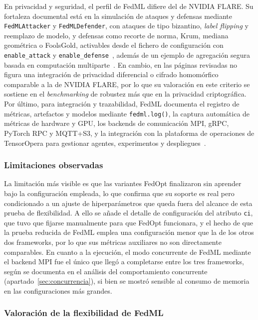 En privacidad y seguridad, el perfil de FedML difiere del de NVIDIA FLARE. Su
fortaleza documental está en la simulación de ataques y defensas mediante
\texttt{FedMLAttacker} y \texttt{FedMLDefender}, con ataques de tipo bizantino,
\textit{label flipping} y reemplazo de modelo, y defensas como recorte de norma, Krum,
mediana geométrica o FoolsGold, activables desde el fichero de configuración con
\texttt{enable\_\allowbreak attack} y \texttt{enable\_\allowbreak defense}~\parencite{fedmlSecurity}, además de un
ejemplo de agregación segura basada en computación multiparte~\parencite{fedmlExamples}.
En cambio, en las páginas revisadas no figura una integración de privacidad diferencial o
cifrado homomórfico comparable a la de NVIDIA FLARE, por lo que su valoración en este
criterio se sostiene en el \textit{benchmarking} de robustez más que en la privacidad
criptográfica. Por último, para integración y trazabilidad, FedML documenta el registro
de métricas, artefactos y modelos mediante \texttt{fedml.log()}, la captura automática de
métricas de hardware y GPU, los backends de comunicación MPI, gRPC, PyTorch RPC y MQTT+S3,
y la integración con la plataforma de operaciones de TensorOpera para gestionar agentes,
experimentos y despliegues~\parencite{fedmlTracking,fedmlExamples}.

\subsubsection{Limitaciones observadas}\label{subsec:flex-fedml-lim}

La limitación más visible es que las variantes FedOpt finalizaron sin aprender bajo
la configuración empleada, lo que confirma que su soporte es real pero condicionado a
un ajuste de hiperparámetros que queda fuera del alcance de esta prueba de
flexibilidad. A ello se añade el detalle de configuración del atributo \texttt{ci},
que tuvo que fijarse manualmente para que FedOpt funcionara, y el hecho de que la
prueba reducida de FedML emplea una configuración menor que la de los otros dos
frameworks, por lo que sus métricas auxiliares no son directamente comparables. En
cuanto a la ejecución, el modo concurrente de FedML mediante el backend MPI fue el
único que llegó a completarse entre los tres frameworks, según se documenta en el
análisis del comportamiento concurrente (apartado~\ref{sec:concurrencia}), si bien se
mostró sensible al consumo de memoria en las configuraciones más grandes.

\subsubsection{Valoración de la flexibilidad de FedML}\label{subsec:flex-fedml-score}

